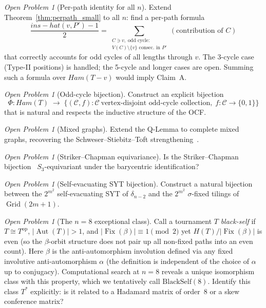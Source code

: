 \documentclass[12pt,reqno]{amsart}
\theoremstyle{plain}
\theoremstyle{definition}
\theoremstyle{remark}
\newtheorem{openquestion}[theorem]{Open Problem}
\DeclareMathOperator{\Aut}{Aut}
\DeclareMathOperator{\Fix}{Fix}
\DeclareMathOperator{\Grid}{Grid}
\newcommand{\Ham}{\mathrm{Ham}}
\newcommand{\op}{\mathrm{op}}
\newcommand{\inshat}{\widehat{\mathrm{ins}}}
\renewcommand{\Ham}{Ham}%
\renewcommand{\inshat}{ins-hat}%
\begin{document}
\begin{openquestion}[Per-path identity for all $n$]\label{oq:perpath}
Extend Theorem~\ref{thm:perpath_small} to all $n$: find a per-path formula
\[
  \frac{\inshat(v,P')-1}{2} = \sum_{\substack{C\ni v,\; \text{odd cycle}:\\
    V(C)\setminus\{v\}\text{ consec.\ in }P'}} (\text{contribution of }C)
\]
that correctly accounts for odd cycles of all lengths through $v$. The 3-cycle
case (Type-II positions) is handled; the 5-cycle and longer cases are open.
Summing such a formula over $\Ham(T{-}v)$ would imply Claim~A.
\end{openquestion}

\begin{openquestion}[Odd-cycle bijection]\label{oq:bijection}
Construct an explicit bijection
\[
  \Phi: \Ham(T) \;\to\; \bigl\{(\mathcal{C}, f) : \mathcal{C}\ \text{vertex-disjoint odd-cycle collection},\;
  f:\mathcal{C}\to\{0,1\}\bigr\}
\]
that is natural and respects the inductive structure of the OCF.
\end{openquestion}

\begin{openquestion}[Mixed graphs]\label{oq:mixed}
Extend the Q-Lemma to complete mixed graphs, recovering the
Schweser--Stiebitz--Toft strengthening~\cite{schweser2025}.
\end{openquestion}

\begin{openquestion}[Striker--Chapman equivariance]\label{oq:striker}
Is the Striker--Chapman bijection~\cite{striker2011,chapman2001}
$S_3$-equivariant under the barycentric identification?
\end{openquestion}

\begin{openquestion}[Self-evacuating SYT bijection]\label{oq:se_bijection}
Construct a natural bijection between the $2^{m^2}$ self-evacuating SYT
of $\delta_{n-2}$ and the $2^{m^2}$ $\sigma$-fixed tilings of $\Grid(2m+1)$.
\end{openquestion}

\begin{openquestion}[The $n=8$ exceptional class]\label{oq:n8}
Call a tournament $T$ \emph{black-self} if $T \cong T^{\op}$, $|\Aut(T)|>1$,
and $|\Fix(\beta)| \equiv 1 \pmod{2}$ yet $H(T)/|\Fix(\beta)|$ is even
(so the $\beta$-orbit structure does not pair up all non-fixed paths into an even
count). Here $\beta$ is the anti-automorphism involution defined via any fixed
involutive anti-automorphism $\alpha$ (the definition is independent of the choice
of $\alpha$ up to conjugacy). Computational search at $n=8$ reveals a unique
isomorphism class with this property, which we tentatively call $\mathrm{BlackSelf}(8)$.
Identify this class $T^*$ explicitly: is it related to a
Hadamard matrix of order~8 or a skew conference matrix?
\end{openquestion}
\end{document}

